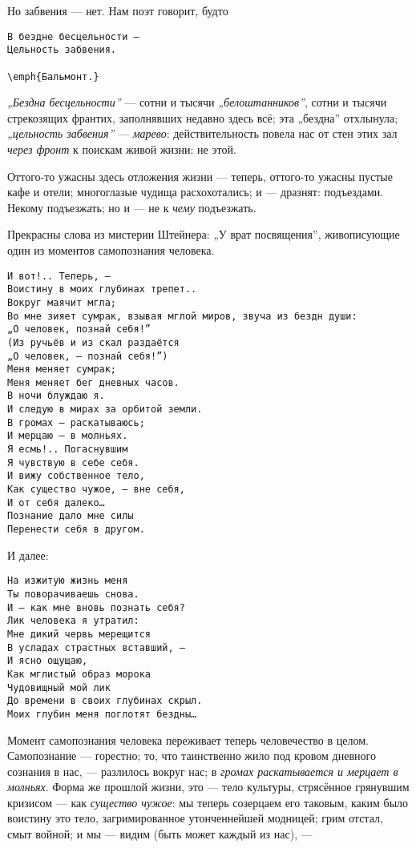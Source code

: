 \documentclass[12pt,a4paper,oneside]{book}
\begin{document}
Но забвения — нет. Нам поэт говорит, будто

\begin{Verbatim}
В бездне бесцельности —
Цельность забвения.
                                                          \emph{Бальмонт.}
\end{Verbatim}

\emph{„Бездна бесцельности”} — сотни и тысячи \emph{„белоштанников”}, сотни и тысячи стрекозящих франтих, заполнявших недавно здесь всё; эта „бездна” отхлынула; \emph{„цельность забвения”} — \emph{марево}: действительность повела нас от стен этих зал \emph{через фронт} к поискам живой жизни: не этой.

Оттого-то ужасны здесь отложения жизни — теперь, оттого-то ужасны пустые кафе и отели; многоглазые чудища расхохотались; и — дразнят: подъездами. Некому подъезжать; но и — не к \emph{чему} подъезжать.

Прекрасны слова из мистерии Штейнера: „У врат посвящения”, живописующие один из моментов самопознания человека.

\begin{Verbatim}
И вот!.. Теперь, —
Воистину в моих глубинах трепет..
Вокруг маячит мгла;
Во мне зияет сумрак, взывая мглой миров, звуча из бездн души:
„О человек, познай себя!”
(Из ручьёв и из скал раздаётся
„О человек, — познай себя!”)
Меня меняет сумрак;
Меня меняет бег дневных часов.
В ночи блуждаю я.
И следую в мирах за орбитой земли.
В громах — раскатываюсь;
И мерцаю — в молньях.
Я есмь!.. Погаснувшим
Я чувствую в себе себя.
И вижу собственное тело,
Как существо чужое, — вне себя,
И от себя далеко…
Познание дало мне силы
Перенести себя в другом.
\end{Verbatim}

И далее:
\begin{Verbatim}
На изжитую жизнь меня
Ты поворачиваешь снова.
И — как мне вновь познать себя?
Лик человека я утратил:
Мне дикий червь мерещится
В усладах страстных вставший, —
И ясно ощущаю,
Как мглистый образ морока
Чудовищный мой лик
До времени в своих глубинах скрыл.
Моих глубин меня поглотят бездны…
\end{Verbatim}

Момент самопознания человека переживает теперь человечество в целом. Самопознание — горестно; то, что таинственно жило под кровом дневного сознания в нас, — разлилось вокруг нас; в \emph{громах раскатывается и мерцает в молньях}. Форма же прошлой жизни, это — тело культуры, стрясённое грянувшим кризисом — как \emph{существо чужое}: мы теперь созерцаем его таковым, каким было воистину это тело, загримированное утонченнейшей модницей; грим отстал, смыт войной; и мы — видим (быть может каждый из нас), —
\end{document}
